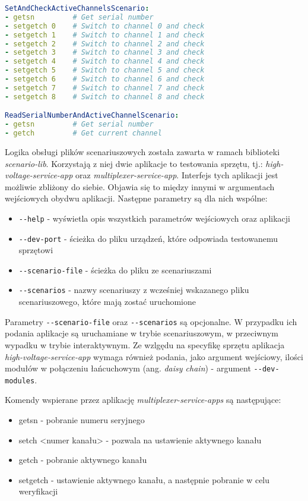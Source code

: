 \begin{lstlisting}[language=yaml,caption={Przykładowy scenariusz w formacie zbliżonym do \emph{YAML}},label={lst:examplary_scenario},frame=single]
SetAndCheckActiveChannelsScenario:
- getsn         # Get serial number
- setgetch 0    # Switch to channel 0 and check
- setgetch 1    # Switch to channel 1 and check
- setgetch 2    # Switch to channel 2 and check
- setgetch 3    # Switch to channel 3 and check
- setgetch 4    # Switch to channel 4 and check
- setgetch 5    # Switch to channel 5 and check
- setgetch 6    # Switch to channel 6 and check
- setgetch 7    # Switch to channel 7 and check
- setgetch 8    # Switch to channel 8 and check

ReadSerialNumberAndActiveChannelScenario:
- getsn         # Get serial number
- getch         # Get current channel
\end{lstlisting}

Logika obsługi plików scenariuszowych została zawarta w ramach biblioteki \emph{scenario-lib}. Korzystają z niej dwie aplikacje to testowania sprzętu, tj.: \emph{high-voltage-service-app} oraz \emph{multiplexer-service-app}. Interfejs tych aplikacji jest możliwie zbliżony do siebie. Objawia się to między innymi w argumentach wejściowych obydwu aplikacji. Następne parametry są dla nich wspólne:
\begin{itemize}
    \item \lstinline{--help} - wyświetla opis wszystkich parametrów wejściowych oraz aplikacji
    \item \lstinline{--dev-port} - ścieżka do pliku urządzeń, które odpowiada testowanemu sprzętowi
    \item \lstinline{--scenario-file} - ścieżka do pliku ze scenariuszami
    \item \lstinline{--scenarios} - nazwy scenariuszy z wcześniej wskazanego pliku scenariuszowego, które mają zostać uruchomione
\end{itemize}

Parametry \lstinline{--scenario-file} oraz \lstinline{--scenarios} są opcjonalne. W przypadku ich podania aplikacje są uruchamiane w trybie scenariuszowym, w przeciwnym wypadku w trybie interaktywnym. Ze wzlgędu na specyfikę sprzętu aplikacja \emph{high-voltage-service-app} wymaga również podania, jako argument wejściowy, ilości modułów w połączeniu łańcuchowym (ang. \emph{daisy chain}) - argument \lstinline{--dev-modules}.

Komendy wspierane przez aplikację \emph{multiplexer-service-apps} są następujące:
\begin{itemize}
    \item getsn - pobranie numeru seryjnego
    \item setch <numer kanału>  - pozwala na ustawienie aktywnego kanału
    \item getch - pobranie aktywnego kanału
    \item setgetch - ustawienie aktywnego kanału, a następnie pobranie w celu weryfikacji
\end{itemize}

